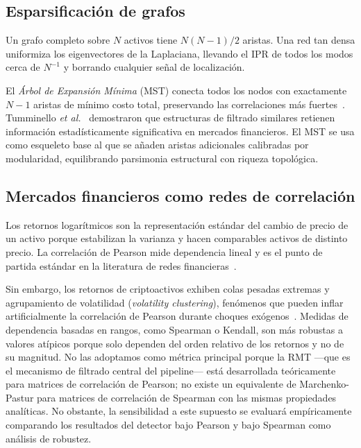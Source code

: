 \subsection{Esparsificación de grafos}

Un grafo completo sobre $N$ activos tiene $N(N-1)/2$ aristas. Una red tan
densa uniformiza los eigenvectores de la Laplaciana, llevando el IPR de
todos los modos cerca de $N^{-1}$ y borrando cualquier señal de
localización.

El \emph{Árbol de Expansión Mínima} (MST) conecta todos los nodos con
exactamente $N-1$ aristas de mínimo costo total, preservando las
correlaciones más fuertes~\cite{mantegna1999}. Tumminello \textit{et
al.}~\cite{tumminello2005} demostraron que estructuras de filtrado
similares retienen información estadísticamente significativa en mercados
financieros. El MST se usa como esqueleto base al que se añaden aristas
adicionales calibradas por modularidad, equilibrando parsimonia
estructural con riqueza topológica.

\subsection{Mercados financieros como redes de correlación}

Los retornos logarítmicos son la representación estándar del cambio de
precio de un activo porque estabilizan la varianza y hacen comparables
activos de distinto precio. La correlación de Pearson mide dependencia
lineal y es el punto de partida estándar en la literatura de redes
financieras~\cite{mantegna1999,plerou1999}.

Sin embargo, los retornos de criptoactivos exhiben colas pesadas extremas
y agrupamiento de volatilidad (\emph{volatility clustering}), fenómenos
que pueden inflar artificialmente la correlación de Pearson durante
choques exógenos~\cite{xu2019anatomy}. Medidas de dependencia basadas en
rangos, como Spearman o Kendall, son más robustas a valores atípicos
porque solo dependen del orden relativo de los retornos y no de su
magnitud. No las adoptamos como métrica principal porque la RMT
---que es el mecanismo de filtrado central del pipeline--- está
desarrollada teóricamente para matrices de correlación de Pearson; no
existe un equivalente de Marchenko-Pastur para matrices de correlación
de Spearman con las mismas propiedades analíticas. No obstante, la
sensibilidad a este supuesto se evaluará empíricamente comparando los
resultados del detector bajo Pearson y bajo Spearman como análisis de
robustez.

